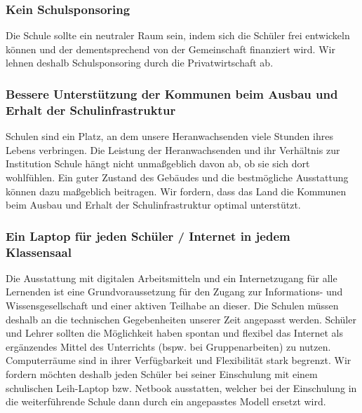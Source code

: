 
\subsubsection{Kein Schulsponsoring}
\abstimmung
Die Schule sollte ein neutraler Raum sein, indem sich die Schüler frei entwickeln können und der dementsprechend von der Gemeinschaft finanziert wird. Wir lehnen deshalb Schulsponsoring durch die Privatwirtschaft ab.
 

\subsubsection{Bessere Unterstützung der Kommunen beim Ausbau und Erhalt der Schulinfrastruktur}
\abstimmung
Schulen sind ein Platz, an dem unsere Heranwachsenden viele Stunden ihres Lebens verbringen. Die Leistung der Heranwachsenden und ihr Verhältnis zur Institution Schule hängt nicht unmaßgeblich davon ab, ob sie sich dort wohlfühlen. Ein guter Zustand des Gebäudes und die bestmögliche Ausstattung können dazu maßgeblich beitragen. Wir fordern, dass das Land die Kommunen beim Ausbau und Erhalt der Schulinfrastruktur optimal unterstützt.
 

\subsubsection{Ein Laptop für jeden Schüler / Internet in jedem Klassensaal}
\abstimmung
Die Ausstattung mit digitalen Arbeitsmitteln und ein Internetzugang für alle Lernenden ist eine Grundvoraussetzung für den Zugang zur Informations- und Wissensgesellschaft und einer aktiven Teilhabe an dieser. Die Schulen müssen deshalb an die technischen Gegebenheiten unserer Zeit angepasst werden. Schüler und Lehrer sollten die Möglichkeit haben spontan und flexibel das Internet als ergänzendes Mittel des Unterrichts (bspw. bei Gruppenarbeiten) zu nutzen. Computerräume sind in ihrer Verfügbarkeit und Flexibilität stark begrenzt. Wir fordern möchten deshalb jeden Schüler bei seiner Einschulung mit einem schulischen Leih-Laptop bzw. Netbook ausstatten, welcher bei der Einschulung in die weiterführende Schule dann durch ein angepasstes Modell ersetzt wird.

